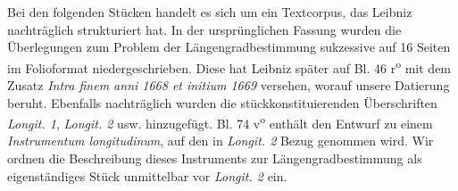 \pstart Bei den folgenden St\"{u}cken handelt es sich um ein Textcorpus, das Leibniz nachtr\"{a}glich strukturiert hat. In der urspr\"{u}nglichen Fassung wurden die \"{U}berlegungen zum Problem der L\"{a}ngengradbestimmung sukzessive auf 16 Seiten im Folioformat niedergeschrieben. Diese hat Leibniz sp\"{a}ter auf Bl. 46 r\textsuperscript{o} mit dem Zusatz \textit{Intra finem anni 1668 et initium 1669} versehen, worauf unsere Datierung beruht. Ebenfalls nachtr\"{a}glich wurden die st\"{u}ckkonstituierenden \"{U}berschriften \textit{Longit. 1}, \textit{Longit. 2} usw. hinzugef\"{u}gt. Bl. 74 v\textsuperscript{o} enth\"{a}lt den Entwurf zu einem \textit{Instrumentum longitudinum}, auf den in \textit{Longit. 2} Bezug genommen wird. Wir ordnen die Beschreibung dieses Instruments zur L\"{a}ngengradbestimmung als eigenst\"{a}ndiges St\"{u}ck unmittelbar vor \textit{Longit. 2} ein.\pend